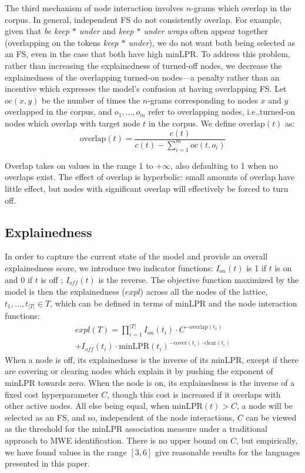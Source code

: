 \documentclass[11pt,letterpaper]{article}
\makeatletter
\def \ie {i.e.,\@ }
\newcommand{\dotts}{...\xspace}
\newcommand{\gap}{$*$\xspace}
\newcommand{\ex}[1]{\textit{#1}\xspace}
\newcommand{\minLPR}{\ensuremath{\text{minLPR}}}
\newcommand{\cover}{\ensuremath{\text{cover}}\xspace}
\newcommand{\clear}{\ensuremath{\text{clear}}\xspace}
\newcommand{\overlap}{\ensuremath{\text{overlap}}\xspace}
\makeatother
\begin{document}
The third mechanism of node interaction involves $n$-grams which overlap in the corpus. In general, independent FS do not consistently overlap. For example, given that \ex{be keep \gap under} and \ex{keep \gap under wraps} often appear together (overlapping on the tokens \ex{keep \gap under}), we do not want both being selected as an FS, even in the case that both have high minLPR. To address this problem, rather than increasing the explainedness of turned-off nodes, we decrease the explainedness of the overlapping turned-on nodes---a penalty rather than an incentive which expresses the model's confusion at having overlapping FS. Let $\mathit{oc}(x,y)$ be the number of times the $n$-grams corresponding to nodes $x$ and $y$ overlapped in the corpus, and $o_1,\dotts,o_m$ refer to overlapping nodes, \ie turned-on nodes which overlap with target node $t$ in the corpus. We define $\overlap(t)$ as:
\begin{displaymath}
	\overlap(t) = \frac{c(t)}{c(t) - \sum_{i=1}^{m}{\mathit{oc}(t,o_i)}}
\end{displaymath}

Overlap takes on values in the range 1 to $+\infty$, also defaulting to 1 when no overlaps exist. The effect of overlap is hyperbolic: small amounts of overlap have little effect, but nodes with significant overlap will effectively be forced to turn off. 

\subsection{Explainedness}

In order to capture the current state of the model and provide an overall explainedness score, we introduce two indicator functions: $I_{\mathit{on}}(t)$ is 1 if $t$ is on and 0 if $t$ is off ; $I_{\mathit{off}}(t)$ is the reverse. The objective function maximized by the model is then the explainedness ($\mathit{expl}$) across all the nodes of the lattice, $t_1,\dots,t_{|T|} \in T$, which can be defined in terms of minLPR and the node interaction functions:
%
\begin{multline}
	\mathit{expl}(T) = \prod_{i=1}^{|T|}{I_{\mathit{on}}(t_i)\cdot C^{-\overlap(t_1)}} \\ + I_{\mathit{off}}(t_i)\cdot\minLPR(t_i)^{-\cover(t_i) \cdot \clear(t_i)}
\end{multline}
\noindent
When a node is off, its explainedness is the inverse of its minLPR, except if there are covering or clearing nodes which explain it by pushing the exponent of minLPR towards zero. When the node is on, its explainedness is the inverse of a fixed cost hyperparameter $C$, though this cost is increased if it overlaps with other active nodes. 
All else being equal, when $\minLPR(t) > C$, a node will be selected as an FS, and so, independent of the node interactions, $C$ can be viewed as the threshold for the minLPR association measure under a traditional approach to MWE identification. There is no upper bound on $C$, but empirically, we have found values in the range $[3,6]$ give reasonable results for the languages presented in this paper.
\end{document}
